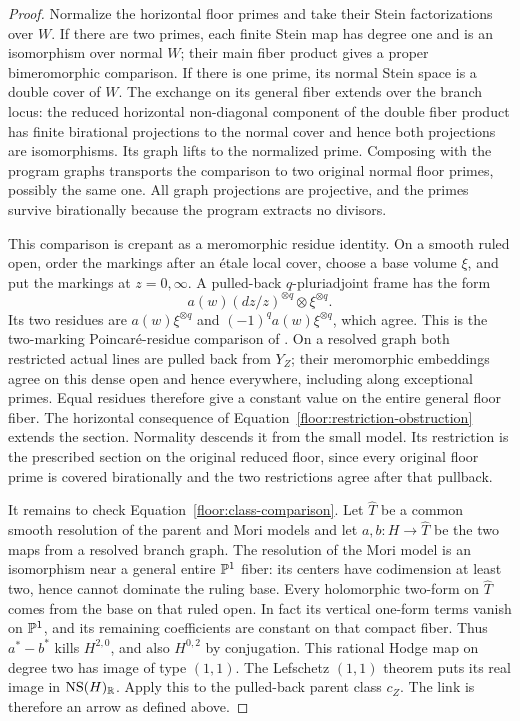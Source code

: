 \begin{proof}
Normalize the horizontal floor primes and take their Stein factorizations
over \(W\).  If there are two primes, each finite Stein map has degree one
and is an isomorphism over normal \(W\); their main fiber product gives
a proper bimeromorphic comparison.  If there is one prime, its normal Stein
space is a double cover of \(W\).  The exchange on its general fiber
extends over the branch locus: the reduced horizontal non-diagonal
component of the double fiber product has finite birational projections
to the normal cover and hence both projections are isomorphisms.  Its graph
lifts to the normalized prime.  Composing with the program graphs transports
the comparison to two original normal floor primes, possibly the same one.
All graph projections are projective, and the primes survive birationally
because the program extracts no divisors.

This comparison is crepant as a meromorphic residue identity.  On a smooth
ruled open, order the markings after an \'etale local cover, choose a base
volume \(\xi\), and put the markings at \(z=0,\infty\).  A pulled-back
\(q\)-pluriadjoint frame has the form
\[
 a(w)(dz/z)^{\otimes q}\otimes\xi^{\otimes q}.
\]
Its two residues are \(a(w)\xi^{\otimes q}\) and
\((-1)^q a(w)\xi^{\otimes q}\), which agree.  This is the two-marking
Poincar\'e-residue comparison of
\cite[Section~3, Definition~13 and Proposition~14]{Kollar2013Sources}.
On a resolved graph both restricted actual lines are pulled back from
\(Y_Z\); their meromorphic embeddings agree on this dense open and hence
everywhere, including along exceptional primes.  Equal residues therefore
give a constant value on the entire general floor fiber.  The horizontal
consequence of Equation~\eqref{floor:restriction-obstruction} extends the section.
Normality descends it from the small model.  Its restriction is the
prescribed section on the original reduced floor, since every original
floor prime is covered birationally and the two restrictions agree after
that pullback.

It remains to check Equation~\eqref{floor:class-comparison}.  Let \(\widehat T\)
be a common smooth resolution of the parent and Mori models and let
\(a,b:H\to\widehat T\) be the two maps from a resolved branch graph.
The resolution of the Mori model is an isomorphism near a general entire
\(\mathbb P^1\) fiber: its centers have codimension at least two, hence cannot
dominate the ruling base.  Every holomorphic two-form on \(\widehat T\)
comes from the base on that ruled open.  In fact its vertical one-form
terms vanish on \(\mathbb P^1\), and its remaining coefficients are constant
on that compact fiber.  Thus \(a^*-b^*\) kills \(H^{2,0}\), and also
\(H^{0,2}\) by conjugation.  This rational Hodge map on degree two has
image of type \((1,1)\).  The Lefschetz \((1,1)\) theorem puts its real
image in \(\operatorname{NS}(H)_{\mathbb R}\).  Apply this to the pulled-back parent class
\(c_Z\).  The link is therefore an arrow as defined above.
\end{proof}

